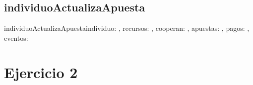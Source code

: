 \documentclass[10pt,a4paper]{article}
\begin{document}
\subsection{individuoActualizaApuesta}

\begin{proc}{individuoActualizaApuesta}{\In individuo: \nat, \In recursos: \TLista{\float} , \In cooperan: \TLista{\bool} , \Inout apuestas: \TLista{\TLista{\float}}, \In pagos: \TLista{\TLista{\float}} , \In eventos: \TLista{\TLista{\nat}} }{}


\end{proc}

\section{Ejercicio 2}
\end{document}
